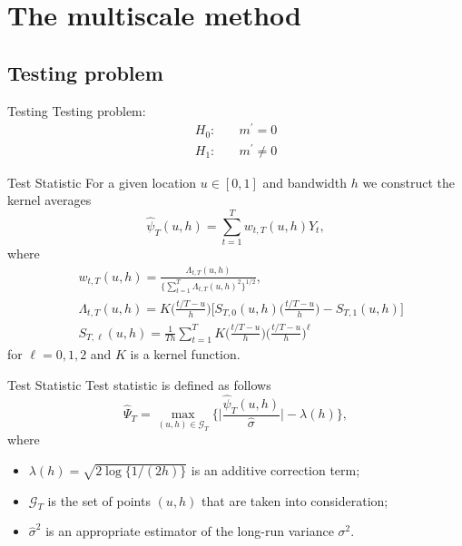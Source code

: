 \documentclass[10pt]{beamer}
\begin{document}
\section{The multiscale method}
\subsection{Testing problem}
\begin{frame}{Testing}
Testing problem:
\begin{align*}
H_0:\quad &m^{\prime} = 0\\
H_1:\quad &m^{\prime}\not= 0
\end{align*}
\end{frame}

\begin{frame}{Test Statistic}
For a given location $u \in [0,1]$ and bandwidth $h$ we construct the kernel averages
\begin{equation*}
\widehat{\psi}_T(u,h) = \sum\limits_{t=1}^T w_{t,T}(u,h) Y_t, 
\end{equation*}
\vspace{-3mm}
where 
\begin{align*}
&w_{t,T}(u,h) = \frac{\Lambda_{t,T}(u,h)}{ \{\sum\nolimits_{t=1}^T \Lambda_{t,T}(u,h)^2\}^{1/2} } ,\\
&\Lambda_{t,T}(u,h) = K\Big(\frac{t/T-u}{h}\Big) \Big[ S_{T,0}(u,h)\Big(\frac{t/T-u}{h}\Big) - S_{T,1}(u,h)  \Big] \\
&S_{T,\ell}(u,h) = \frac{1}{Th} \sum\nolimits_{t=1}^T K\Big(\frac{t/T-u}{h}\Big) \Big(\frac{t/T-u}{h}\Big)^\ell
\end{align*}
for $\ell = 0,1,2$ and $K$ is a kernel function.
\end{frame}

\begin{frame}[label = frame_teststatistic]{Test Statistic}
Test statistic is defined as follows
\begin{equation*}
\widehat{\Psi}_T = \max_{(u,h) \in \mathcal{G}_T} \Big\{ \Big|\frac{\widehat{\psi}_T(u,h)}{\widehat{\sigma}}\Big| - \lambda(h) \Big\}, 
\end{equation*} 
where 
\begin{itemize}
\item $\lambda(h) = \sqrt{2 \log \{ 1/(2h) \}}$ is an additive correction term; \hyperlink{frame_lambda}{}\pause
\item $\mathcal{G}_T$ is the set of points $(u,h)$ that are taken into consideration;\pause
\item $\widehat{\sigma}^2$ is an appropriate estimator of the long-run variance $\sigma^2$.
\end{itemize}
\end{frame}
\end{document}
